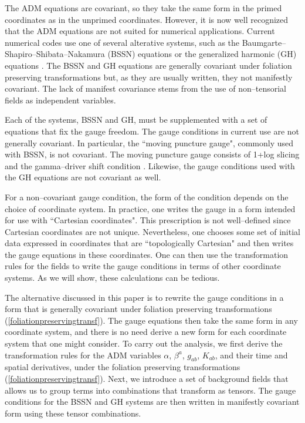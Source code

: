 The ADM equations are covariant, so they take the same form in the primed coordinates as in the unprimed coordinates. However, it is now 
well recognized that the ADM equations 
are not suited for numerical applications. Current numerical codes use one of several alterative systems, such as the 
Baumgarte--Shapiro--Shibata--Nakamura (BSSN) equations \cite{Shibata:1995we,Baumgarte:1998te} or the generalized harmonic (GH) 
equations \cite{Friedrich:1985,Garfinkle:2001ni}.
The BSSN and GH equations are generally covariant under foliation preserving transformations but, as they are usually written, 
they not manifestly covariant. The lack of manifest covariance stems from the use of non--tensorial fields as independent variables. 

Each of the systems, BSSN and GH, must be supplemented with a set of equations that fix the gauge freedom. 
The gauge conditions in current use are not generally covariant. In particular, the ``moving puncture gauge", commonly used with BSSN, is not covariant. 
The moving puncture gauge consists of 1+log slicing \cite{Bona:1994dr} and the
gamma--driver shift condition \cite{Alcubierre:2002kk}.  Likewise, the gauge conditions used 
with the GH equations \cite{Pretorius:2006tp,Szilagyi:2009qz, Lindblom:2009tu} are not covariant as well.  

For a non--covariant gauge condition, the form of the condition depends on the choice of coordinate system. 
In practice, one writes the gauge  in a form intended for use with ``Cartesian coordinates". This prescription is not  well--defined 
since Cartesian coordinates are not unique. Nevertheless, one chooses some set of initial data expressed in coordinates that are ``topologically Cartesian"  
and then writes the gauge equations in these coordinates.  One can then use the transformation rules for the fields to write the gauge conditions in terms of 
other coordinate systems. As we will show, these calculations can be tedious. 

The alternative discussed in this paper is to rewrite the gauge conditions in a form that is generally covariant under foliation preserving 
transformations (\ref{foliationpreservingtransf}). The gauge equations then take the same form in any coordinate system, and there is no need derive a new form 
for each coordinate system that one might consider. To carry out the analysis, we first derive the transformation rules for the ADM variables $\alpha$, $\beta^a$, 
$g_{ab}$, $K_{ab}$, and their time and spatial derivatives, under the foliation preserving transformations (\ref{foliationpreservingtransf}). Next, we introduce a 
set of background fields that allows us to group terms into combinations that transform as tensors. The gauge conditions for the BSSN and GH systems are 
then written in manifestly covariant form using these tensor combinations. 

